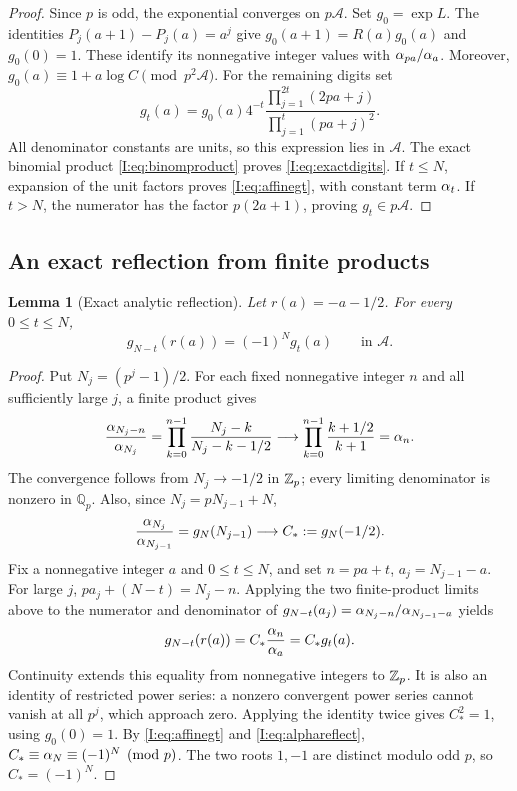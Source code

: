 \documentclass[11pt,letterpaper]{article}
\newtheorem{lemma}[theorem]{Lemma}
\theoremstyle{definition}
\theoremstyle{remark}
\begin{document}
\begin{proof}
Since $p$ is odd, the exponential converges on $p\mathcal A$.  Set
$g_0=\exp L$.  The identities $P_j(a+1)-P_j(a)=a^j$ give
$g_0(a+1)=R(a)g_0(a)$ and $g_0(0)=1$.  These identify its nonnegative
integer values with $\alpha_{pa}/\alpha_a$.  Moreover,
$g_0(a)\equiv1+a\log C\pmod{p^2\mathcal A}$.
For the remaining digits set
\begin{equation}\label{I:eq:gtproduct}
 g_t(a)=g_0(a)4^{-t}
       \frac{\prod_{j=1}^{2t}(2pa+j)}
            {\prod_{j=1}^t(pa+j)^2}.
\end{equation}
All denominator constants are units, so this expression lies in
$\mathcal A$.  The exact binomial product \eqref{I:eq:binomproduct}
proves \eqref{I:eq:exactdigits}.  If $t\le N$, expansion of the unit
factors proves \eqref{I:eq:affinegt}, with constant term $\alpha_t$.
If $t>N$, the numerator has the factor $p(2a+1)$, proving
$g_t\in p\mathcal A$.
\end{proof}

\subsection{An exact reflection from finite products}

\begin{lemma}[Exact analytic reflection]\label{I:lem:exactreflection}
Let $r(a)=-a-1/2$.  For every $0\le t\le N$,
\begin{equation}\label{I:eq:exactreflection}
 g_{N-t}(r(a))=(-1)^N g_t(a)
                                      \qquad\text{in }\mathcal A.
\end{equation}
\end{lemma}
\begin{proof}
Put $N_j=(p^j-1)/2$.  For each fixed nonnegative integer $n$ and all
sufficiently large $j$, a finite product gives
\[
 \frac{\alpha_{N_j-n}}{\alpha_{N_j}}
       =\prod_{k=0}^{n-1}\frac{N_j-k}{N_j-k-1/2}
       \longrightarrow\prod_{k=0}^{n-1}\frac{k+1/2}{k+1}
       =\alpha_n.
\]
The convergence follows from $N_j\to-1/2$ in $\mathbb Z_p$; every limiting
denominator is nonzero in $\mathbb Q_p$.
Also, since $N_j=pN_{j-1}+N$,
\[
 \frac{\alpha_{N_j}}{\alpha_{N_{j-1}}}
     =g_N(N_{j-1})\longrightarrow C_*:=g_N(-1/2).
\]
Fix a nonnegative integer $a$ and $0\le t\le N$, and set
$n=pa+t$, $a_j=N_{j-1}-a$.  For large $j$,
$pa_j+(N-t)=N_j-n$.  Applying the two finite-product limits above
to the numerator and denominator of
$g_{N-t}(a_j)=\alpha_{N_j-n}/\alpha_{N_{j-1}-a}$ yields
\[
 g_{N-t}(r(a))=C_*\frac{\alpha_n}{\alpha_a}=C_*g_t(a).
\]
Continuity extends this equality from nonnegative integers to $\mathbb Z_p$.
It is also an identity of restricted power series: a nonzero convergent
power series cannot vanish at all $p^j$, which approach zero.
Applying the identity twice gives $C_*^2=1$, using $g_0(0)=1$.
By \eqref{I:eq:affinegt} and \eqref{I:eq:alphareflect},
$C_*\equiv\alpha_N\equiv(-1)^N\pmod p$.
The two roots $1,-1$ are distinct modulo odd $p$, so
$C_*=(-1)^N$.
\end{proof}
\end{document}
